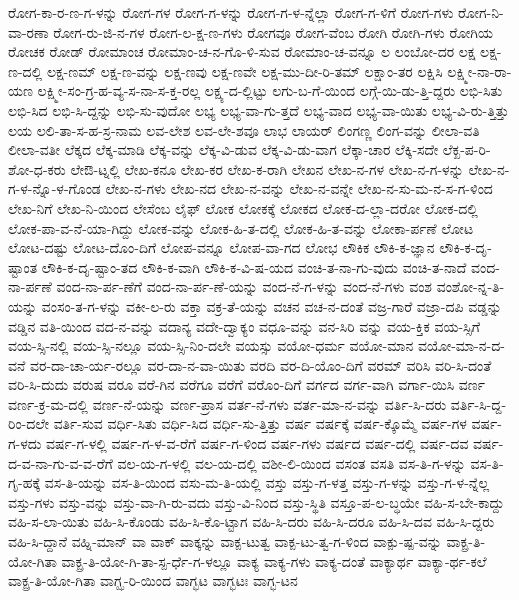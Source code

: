 {ರೋಗ-ಕಾ-ರ-ಣ-ಗ-ಳನ್ನು
ರೋಗ-ಗಳ
ರೋಗ-ಗ-ಳನ್ನು
ರೋಗ-ಗ-ಳ-ನ್ನೆಲ್ಲಾ
ರೋಗ-ಗ-ಳಿಗೆ
ರೋಗ-ಗಳು
ರೋಗ-ನಿ-ವಾ-ರಣಾ
ರೋಗ-ರು-ಜಿ-ನ-ಗಳ
ರೋಗ-ಲ-ಕ್ಷ-ಣ-ಗಳು
ರೋಗವೂ
ರೋಗ-ವೆಂಬ
ರೋಗಿ
ರೋಗಿ-ಗಳು
ರೋಗಿಯ
ರೋಚಕ
ರೋಡ್
ರೋಮಾಂಚ
ರೋಮಾಂ-ಚ-ನ-ಗೊ-ಳಿ-ಸುವ
ರೋಮಾಂ-ಚ-ವನ್ನೂ
ಲ
ಲಂಬೋ-ದರ
ಲಕ್ಷ
ಲಕ್ಷ-ಣ-ದಲ್ಲಿ
ಲಕ್ಷ-ಣಮ್
ಲಕ್ಷ-ಣ-ವನ್ನು
ಲಕ್ಷ-ಣವು
ಲಕ್ಷ-ಣವೇ
ಲಕ್ಷ-ಮು-ದೀ-ರಿ-ತಮ್
ಲಕ್ಷಾಂ-ತರ
ಲಕ್ಷಿಸಿ
ಲಕ್ಷ್ಮೀ-ನಾ-ರಾ-ಯಣ
ಲಕ್ಷ್ಮೀ-ಸಂ-ಗ್ರ-ಹ-ವ್ಯ-ಸ-ನಾ-ಸ-ಕ್ತ-ರಲ್ಲ
ಲಕ್ಷ್ಯ-ದ-ಲ್ಲಿಟ್ಟು
ಲಗು-ಬ-ಗೆ-ಯಿಂದ
ಲಗ್ಗೆ-ಯಿ-ಡು-ತ್ತಿ-ದ್ದರು
ಲಭಿ-ಸಿತು
ಲಭಿ-ಸಿದ
ಲಭಿ-ಸಿ-ದ್ದನ್ನು
ಲಭಿ-ಸು-ವುದೋ
ಲಭ್ಯ
ಲಭ್ಯ-ವಾ-ಗು-ತ್ತದೆ
ಲಭ್ಯ-ವಾದ
ಲಭ್ಯ-ವಾ-ಯಿತು
ಲಭ್ಯ-ವಿ-ರು-ತ್ತಿತ್ತು
ಲಯ
ಲಲಿ-ತಾ-ಸ-ಹ-ಸ್ರ-ನಾಮ
ಲವ-ಲೇಶ
ಲವ-ಲೇ-ಶವೂ
ಲಾಭ
ಲಾಯರ್
ಲಿಂಗಣ್ಣ
ಲಿಂಗ-ವನ್ನು
ಲೀಲಾ-ವತಿ
ಲೀಲಾ-ವತೀ
ಲೆಕ್ಕದ
ಲೆಕ್ಕ-ಮಾಡಿ
ಲೆಕ್ಕ-ವನ್ನು
ಲೆಕ್ಕ-ವಿ-ಡುವ
ಲೆಕ್ಕ-ವಿ-ಡು-ವಾಗ
ಲೆಕ್ಕಾ-ಚಾರ
ಲೆಕ್ಕಿ-ಸದೇ
ಲೆಕ್ಖ-ಪ-ರಿ-ಶೋ-ಧ-ಕರು
ಲೇಔ-ಟ್ನಲ್ಲಿ
ಲೇಖ-ಕನೂ
ಲೇಖ-ಕರ
ಲೇಖ-ಕ-ರಾಗಿ
ಲೇಖನ
ಲೇಖ-ನ-ಗಳ
ಲೇಖ-ನ-ಗ-ಳನ್ನು
ಲೇಖ-ನ-ಗ-ಳ-ನ್ನೊ-ಳ-ಗೊಂಡ
ಲೇಖ-ನ-ಗಳು
ಲೇಖ-ನದ
ಲೇಖ-ನ-ವನ್ನು
ಲೇಖ-ನ-ವನ್ನೇ
ಲೇಖ-ನ-ಸು-ಮ-ನ-ಸ-ಗ-ಳಿಂದ
ಲೇಖ-ನಿಗೆ
ಲೇಖ-ನಿ-ಯಿಂದ
ಲೇಸೆಂಬ
ಲೈಫ್
ಲೋಕ
ಲೋಕಕ್ಕೆ
ಲೋಕದ
ಲೋಕ-ದ-ಲ್ಲಾ-ದರೋ
ಲೋಕ-ದಲ್ಲಿ
ಲೋಕ-ಪಾ-ವ-ನೆ-ಯಾ-ಗಿದ್ದು
ಲೋಕ-ವನ್ನು
ಲೋಕ-ಹಿ-ತ-ದಲ್ಲಿ
ಲೋಕ-ಹಿ-ತ-ವನ್ನು
ಲೋಕಾ-ರ್ಪಣೆ
ಲೋಟ
ಲೋಟ-ದಷ್ಟು
ಲೋಟ-ದೊಂ-ದಿಗೆ
ಲೋಪ-ವನ್ನೂ
ಲೋಪ-ವಾ-ಗದ
ಲೋಭ
ಲೌಕಿಕ
ಲೌಕಿ-ಕ-ಜ್ಞಾನ
ಲೌಕಿ-ಕ-ದೃ-ಷ್ಟಾಂತ
ಲೌಕಿ-ಕ-ದೃ-ಷ್ಟಾಂ-ತದ
ಲೌಕಿ-ಕ-ವಾಗಿ
ಲೌಕಿ-ಕ-ವಿ-ಷ-ಯದ
ವಂಚಿ-ತ-ನಾ-ಗು-ವುದು
ವಂಚಿ-ತ-ನಾದೆ
ವಂದ-ನಾ-ರ್ಪಣೆ
ವಂದ-ನಾ-ರ್ಪ-ಣೆಗೆ
ವಂದ-ನಾ-ರ್ಪ-ಣೆ-ಯನ್ನು
ವಂದ-ನೆ-ಗ-ಳನ್ನು
ವಂದ-ನೆ-ಗಳು
ವಂಶ
ವಂಶೋ-ನ್ನ-ತಿ-ಯನ್ನು
ವಂಸಂ-ತ-ಗ-ಳನ್ನು
ವಕೀ-ಲ-ರು
ವಕ್ತಾ
ವಕ್ರ-ತೆ-ಯನ್ನು
ವಚನ
ವಚ-ನ-ದಂತೆ
ವಜ್ರ-ಗಾರೆ
ವಜ್ರಾ-ದಪಿ
ವಡ್ಡನ್ನು
ವಡ್ಡಿನ
ವತಿ-ಯಿಂದ
ವದ-ನ-ವನ್ನು
ವದಾನ್ಯ
ವದೇ-ದ್ವಾಕ್ಯಂ
ವಧೂ-ವನ್ನು
ವನ-ಸಿರಿ
ವನ್ನು
ವಯ-ಕ್ತಿಕ
ವಯ-ಸ್ಸಿಗೆ
ವಯ-ಸ್ಸಿ-ನಲ್ಲಿ
ವಯ-ಸ್ಸಿ-ನಲ್ಲೂ
ವಯ-ಸ್ಸಿ-ನಿಂ-ದಲೇ
ವಯಸ್ಸು
ವಯೋ-ಧರ್ಮ
ವಯೋ-ಮಾನ
ವಯೋ-ಮಾ-ನ-ದ-ವನೆ
ವರ-ದಾ-ಚಾ-ರ್ಯ-ರಲ್ಲೂ
ವರ-ದಾ-ನ-ವಾ-ಯಿತು
ವರದಿ
ವರ-ದಿ-ಯೊಂ-ದಿಗೆ
ವರಮ್
ವರಿಸಿ
ವರಿ-ಸಿ-ದಂತೆ
ವರಿ-ಸಿ-ದುದು
ವರುಷ
ವರೂ
ವರೆ-ಗಿನ
ವರೆಗೂ
ವರೆಗೆ
ವರೊಂ-ದಿಗೆ
ವರ್ಗದ
ವರ್ಗ-ವಾಗಿ
ವರ್ಗಾ-ಯಿಸಿ
ವರ್ಣ
ವರ್ಣ-ಕ್ರ-ಮ-ದಲ್ಲಿ
ವರ್ಣ-ನೆ-ಯನ್ನು
ವರ್ಣ-ಪ್ರಾಸ
ವರ್ತ-ನೆ-ಗಳು
ವರ್ತ-ಮಾ-ನ-ವನ್ನು
ವರ್ತಿ-ಸಿ-ದರು
ವರ್ತಿ-ಸಿ-ದ್ದ-ರಿಂ-ದಲೇ
ವರ್ತಿ-ಸುವ
ವರ್ಧಿ-ಸಿತು
ವರ್ಧಿ-ಸಿದ
ವರ್ಧಿ-ಸು-ತ್ತಿತ್ತು
ವರ್ಷ
ವರ್ಷಕ್ಕೆ
ವರ್ಷ-ಕ್ಕೊಮ್ಮೆ
ವರ್ಷ-ಗಳ
ವರ್ಷ-ಗ-ಳದು
ವರ್ಷ-ಗ-ಳಲ್ಲಿ
ವರ್ಷ-ಗ-ಳ-ವ-ರೆಗೆ
ವರ್ಷ-ಗ-ಳಿಂದ
ವರ್ಷ-ಗಳು
ವರ್ಷದ
ವರ್ಷ-ದಲ್ಲಿ
ವರ್ಷ-ದವ
ವರ್ಷ-ದ-ವ-ನಾ-ಗು-ವ-ವ-ರೆಗೆ
ವಲ-ಯ-ಗ-ಳಲ್ಲಿ
ವಲ-ಯ-ದಲ್ಲಿ
ವಶೀ-ಲಿ-ಯಿಂದ
ವಸಂತ
ವಸತಿ
ವಸ-ತಿ-ಗ-ಳನ್ನು
ವಸ-ತಿ-ಗೃ-ಹಕ್ಕೆ
ವಸ-ತಿ-ಯನ್ನು
ವಸ-ತಿ-ಯಿಂದ
ವಸು-ಮ-ತಿ-ಯಲ್ಲಿ
ವಸ್ತು
ವಸ್ತು-ಗ-ಳತ್ತ
ವಸ್ತು-ಗ-ಳನ್ನು
ವಸ್ತು-ಗ-ಳ-ನ್ನೆಲ್ಲ
ವಸ್ತು-ಗಳು
ವಸ್ತು-ವನ್ನು
ವಸ್ತು-ವಾ-ಗಿ-ರು-ವದು
ವಸ್ತು-ವಿ-ನಿಂದ
ವಸ್ತು-ಸ್ಥಿತಿ
ವಸ್ತೂ-ಪ-ಲ-ಬ್ಧಯೇ
ವಹಿ-ಸ-ಬೇ-ಕಾದ್ದು
ವಹಿ-ಸ-ಲಾ-ಯಿತು
ವಹಿ-ಸಿ-ಕೊಂಡು
ವಹಿ-ಸಿ-ಕೊ-ಟ್ಟಾಗ
ವಹಿ-ಸಿ-ದರು
ವಹಿ-ಸಿ-ದರೂ
ವಹಿ-ಸಿ-ದವ
ವಹಿ-ಸಿ-ದ್ದರು
ವಹಿ-ಸಿ-ದ್ದಾನೆ
ವಹ್ನಿ-ಮಾನ್
ವಾ
ವಾಕ್
ವಾಕ್ಕನ್ನು
ವಾಕ್ಪ-ಟುತ್ವ
ವಾಕ್ಪ-ಟು-ತ್ವ-ಗ-ಳಿಂದ
ವಾಕ್ಪು-ಷ್ಪ-ವನ್ನು
ವಾಕ್ಪ್ರ-ತಿ-ಯೋ-ಗಿತಾ
ವಾಕ್ಪ್ರ-ತಿ-ಯೋ-ಗಿ-ತಾ-ಸ್ಪ-ರ್ಧೆ-ಗ-ಳಲ್ಲೂ
ವಾಕ್ಯ
ವಾಕ್ಯ-ಗಳು
ವಾಕ್ಯ-ದಂತೆ
ವಾಕ್ಯಾರ್ಥ
ವಾಕ್ಯಾ-ರ್ಥ-ಕಲೆ
ವಾಕ್ಪ್ರ-ತಿ-ಯೋ-ಗಿತಾ
ವಾಗ್ಝ-ರಿ-ಯಿಂದ
ವಾಗ್ಭಟ
ವಾಗ್ಭಟಃ
ವಾಗ್ಭ-ಟನ
}
